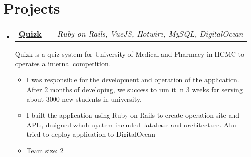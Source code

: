\documentclass[a4paper,11pt]{article}
\makeatletter
\newcommand{\resumeItem}[1]{
  \item\small{#1}
}
\newcommand{\resumeItemListStart}{\begin{itemize}[rightmargin=0.11in]}
\newcommand{\resumeItemListEnd}{\end{itemize}}
\newcommand{\resumeTrioHeading}[3]{
  \item\small{
    \begin{tabular*}{0.96\textwidth}[t]{
      l@{\extracolsep{\fill}}c@{\extracolsep{\fill}}r
    }
      \textbf{#1} & \textit{#2} & \textit{#3}
      \smallskip
    \end{tabular*}
  }
}
\newcommand{\resumeHeadingListStart}{
  \begin{itemize}[leftmargin=0.15in, label={}]
}
\newcommand{\resumeHeadingListEnd}{\end{itemize}}
\makeatother
\begin{document}
\section{Projects}
  \resumeHeadingListStart{}
    \resumeTrioHeading{\href{https://github.com/quizk}{Quizk}}{}{Ruby on Rails, VueJS, Hotwire, MySQL, DigitalOcean}
    \small{Quizk is a quiz system for University of Medical and Pharmacy in HCMC to operates a internal competition.}
      \resumeItemListStart{}
        \resumeItem{I was responsible for the development and operation of the application. After 2 months of developing, we success to run it in 3 weeks for serving about 3000 new students in university.}
        \resumeItem{I built the application using Ruby on Rails to create operation site and APIs, designed whole system included database and architecture. Also tried to deploy application to DigitalOcean}
        \resumeItem{Team size: 2}
      \resumeItemListEnd{}
  \resumeHeadingListEnd{}
\end{document}
